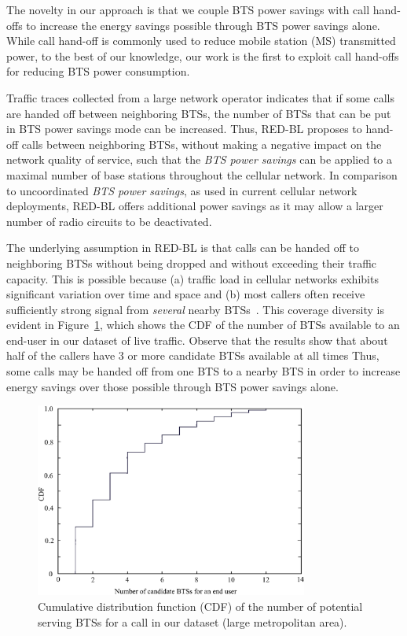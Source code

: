 The novelty in our approach is that we couple BTS power savings with call hand-offs to increase the
energy savings possible through BTS power savings alone. While call hand-off is commonly used to
reduce mobile station (MS) transmitted power, to the best of our knowledge, our work is the first to exploit call hand-offs for reducing BTS power consumption.

Traffic traces collected from a large network operator indicates that if some calls are handed off between
neighboring BTSs, the number of BTSs that can be put in BTS power savings mode can be increased.
Thus, RED-BL proposes to hand-off calls between neighboring BTSs, without making a negative
impact on the network quality of service, such that the \textit{BTS power savings} can be applied to a
maximal number of base stations throughout the cellular network. In comparison to uncoordinated \textit{BTS power savings}, as used in current cellular network deployments, RED-BL
offers additional power savings as it may allow a larger number of radio circuits to be deactivated.

The underlying assumption in RED-BL is that calls can be handed off to neighboring BTSs
without being dropped and without exceeding their traffic capacity. This is possible because (a) traffic load in cellular networks exhibits significant variation over time and space and (b)
most callers often receive sufficiently strong signal from \emph{several} nearby
BTSs~\cite{Peng:2011:BTSSaving:Mobicom,lowcarb:2013:globecom}.
This coverage diversity is evident in Figure~\ref{fig:btscdf}, which shows the CDF of the number of BTSs available to an end-user in our dataset of live traffic.
Observe that the results show that about half of the callers have 3 or more candidate BTSs available at all times
Thus, some calls may be handed off from one BTS to a nearby BTS in order to increase energy savings over those
possible through BTS power savings alone.
\begin{figure}[h!]
\centering
\includegraphics[width=0.8\textwidth]{pics/ilyas2.eps}
\caption{Cumulative distribution function (CDF) of the number of potential serving BTSs for a call in our dataset (large metropolitan area).}
\label{fig:btscdf}
\end{figure}

